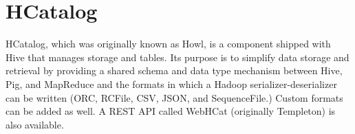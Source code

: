 \section{HCatalog}

HCatalog, which was originally known as Howl, is a component shipped
with Hive that manages storage and tables. Its purpose is
to simplify data storage and retrieval by providing a shared schema
and data type mechanism between Hive, Pig, and
MapReduce and the formats in which a
Hadoop serializer-deserializer can be written
(ORC, RCFile, CSV,
JSON, and SequenceFile.) Custom
formats can be added as well. A REST API called
WebHCat (originally Templeton) is also
available\cite{hid-sp18-419-www-hc-wiki}.
